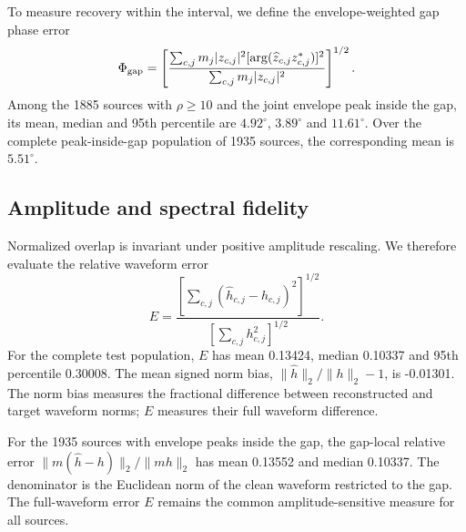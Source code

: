 \documentclass[10pt,prd,aps,a4paper,twocolumn,superscriptaddress,nofootinbib,floatfix]{revtex4-2}
\begin{document}
To measure recovery within the interval, we define the envelope-weighted gap phase error
\begin{equation}
\Phi_{\rm gap}=\left[\frac{\sum_{c,j}m_j|z_{c,j}|^2[\arg(\widehat z_{c,j}z_{c,j}^*)]^2}{\sum_{c,j}m_j|z_{c,j}|^2}\right]^{1/2}.\label{eq:gap_phase}
\end{equation}
Among the 1885 sources with $\rho\ge10$ and the joint envelope peak inside the gap, its mean, median and 95th percentile are $4.92^\circ$, $3.89^\circ$ and $11.61^\circ$. Over the complete peak-inside-gap population of 1935 sources, the corresponding mean is $5.51^\circ$.



\subsection{Amplitude and spectral fidelity}\label{subsec:MeanSquaredError}\label{subsec:AmplitudeDensityFrequencySpectrum}
Normalized overlap is invariant under positive amplitude rescaling. We therefore evaluate the relative waveform error
\begin{equation}
E=\frac{\left[\sum_{c,j}(\widehat h_{c,j}-h_{c,j})^2\right]^{1/2}}{\left[\sum_{c,j}h_{c,j}^2\right]^{1/2}}.
\end{equation}
For the complete test population, $E$ has mean 0.13424, median 0.10337 and 95th percentile 0.30008. The mean signed norm bias, $\|\widehat h\|_2/\|h\|_2-1$, is -0.01301. The norm bias measures the fractional difference between reconstructed and target waveform norms; $E$ measures their full waveform difference.

For the 1935 sources with envelope peaks inside the gap, the gap-local relative error $\|m(\widehat h-h)\|_2/\|mh\|_2$ has mean 0.13552 and median 0.10337. The denominator is the Euclidean norm of the clean waveform restricted to the gap. The full-waveform error $E$ remains the common amplitude-sensitive measure for all sources.
\end{document}
